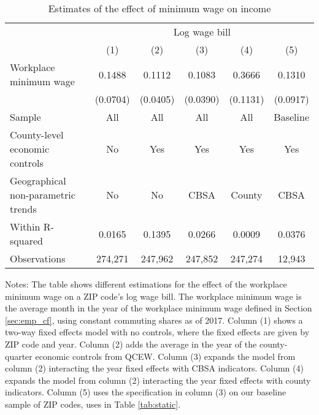 \begin{table}[]
    \caption{Estimates of the effect of minimum wage on income}
    \label{tab:static_wages}

    \begin{tabular}{@{}lccccc@{}}
        \toprule
                                        & \multicolumn{5}{c}{Log wage bill}                         \\ \cmidrule(l){2-6} 
                                        & (1)       & (2)      & (3)      & (4)      & (5)          \\ \midrule
        Workplace minimum wage             & 0.1488    & 0.1112   & 0.1083   & 0.3666      & 0.1310     \\
                                        & (0.0704)  & (0.0405) & (0.0390) & (0.1131)    & (0.0917)   \\ \midrule
        Sample                             & All       & All      & All      & All       & Baseline     \\
        County-level economic controls     & No        & Yes      & Yes      & Yes       & Yes          \\
        Geographical non-parametric trends & No        & No       & CBSA     & County     & CBSA         \\
        Within R-squared                   & 0.0165   & 0.1395   & 0.0266   & 0.0009     & 0.0376        \\
        Observations                       & 274,271   & 247,962  & 247,852  & 247,274    & 12,943       \\ \bottomrule
    \end{tabular}
    
    \begin{minipage}{.95\textwidth} \footnotesize
        \vspace{2mm}
        Notes: The table shows different estimations for the effect of the workplace minimum 
		wage on a ZIP code's log wage bill.
		The workplace minimum wage is the average month in the year of the workplace minimum 
		wage defined in Section \ref{sec:emp_cf}, using constant commuting shares as of 2017.
		Column (1) shows a two-way fixed effects model with no controls, where the fixed 
		effects are given by ZIP code and year.
		Column (2) adds the average in the year of the county-quarter economic controls from
		QCEW.
		Column (3) expands the model from column (2) interacting the year fixed effects 
		with CBSA indicators.
		Column (4) expands the model from column (2) interacting the year fixed effects 
		with county indicators.
		Column (5) uses the specification in column (3) on our baseline sample of ZIP codes,
		uses in Table \ref{tab:static}.
    \end{minipage}
\end{table}


